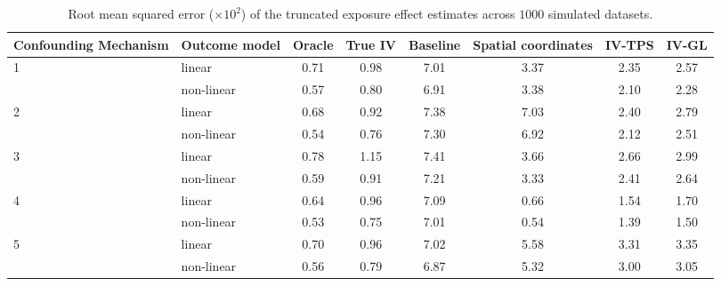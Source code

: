 \begin{table}[!ht]
\centering
\small
\setlength{\tabcolsep}{5pt}
\begin{tabular}{llcccccc}
\toprule
Confounding Mechanism & Outcome model & Oracle & True IV & Baseline & Spatial coordinates & IV-TPS & IV-GL \\
\midrule
1 & linear & 0.71 & 0.98 & 7.01 & 3.37 & 2.35 & 2.57 \\
 & non-linear & 0.57 & 0.80 & 6.91 & 3.38 & 2.10 & 2.28 \\
2 & linear & 0.68 & 0.92 & 7.38 & 7.03 & 2.40 & 2.79 \\
 & non-linear & 0.54 & 0.76 & 7.30 & 6.92 & 2.12 & 2.51 \\
3 & linear & 0.78 & 1.15 & 7.41 & 3.66 & 2.66 & 2.99 \\
 & non-linear & 0.59 & 0.91 & 7.21 & 3.33 & 2.41 & 2.64 \\
4 & linear & 0.64 & 0.96 & 7.09 & 0.66 & 1.54 & 1.70 \\
 & non-linear & 0.53 & 0.75 & 7.01 & 0.54 & 1.39 & 1.50 \\
5 & linear & 0.70 & 0.96 & 7.02 & 5.58 & 3.31 & 3.35 \\
 & non-linear & 0.56 & 0.79 & 6.87 & 5.32 & 3.00 & 3.05 \\
\bottomrule
\end{tabular}
\caption{Root mean squared error ($\times 10^2$) of the truncated exposure effect estimates across $1000$ simulated datasets.}
\label{tab:main-rmse}
\end{table}
